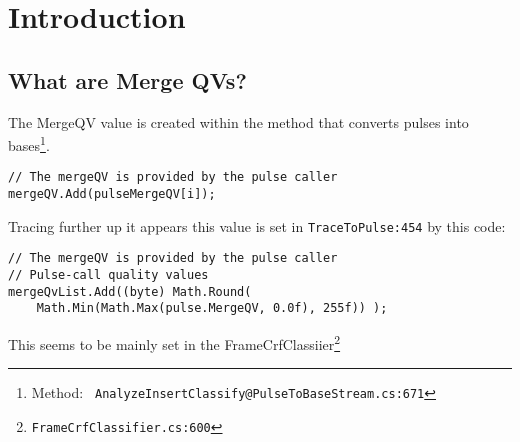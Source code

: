 \documentclass[fleqn,10pt]{SelfArx} %
\begin{document}
\flushbottom %

\maketitle %

\tableofcontents %

\thispagestyle{empty} %


\section*{Introduction} %



\subsection{What are Merge QVs?}
The MergeQV value is created within the method that converts pulses into bases\footnote{Method: \texttt{ AnalyzeInsertClassify@PulseToBaseStream.cs:671}}.

\lstset{style=sharpc}
\begin{lstlisting}[frame=single]
// The mergeQV is provided by the pulse caller
mergeQV.Add(pulseMergeQV[i]);
\end{lstlisting}

Tracing further up it appears this value is set in \texttt{TraceToPulse:454} by this code:

\lstset{style=sharpc}
\begin{lstlisting}[frame=single]
// The mergeQV is provided by the pulse caller
// Pulse-call quality values
mergeQvList.Add((byte) Math.Round(
	Math.Min(Math.Max(pulse.MergeQV, 0.0f), 255f)) );

\end{lstlisting}

This seems to be mainly set in the FrameCrfClassiier\footnote{\texttt{FrameCrfClassifier.cs:600}}
\end{document}
